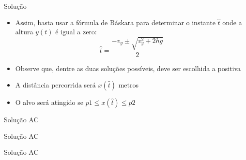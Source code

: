 \begin{frame}[fragile]{Solução}

    \begin{itemize}
        \item Assim, basta usar a fórmula de Báskara para determinar o instante $\hat{t}$ onde
            a altura $y(t)$ é igual a zero:
        \[
            \hat{t} = \frac{-v_y \pm \sqrt{v_y^2 + 2hg}}{2}
        \]

        \item Observe que, dentre as duas soluções possíveis, deve ser escolhida a positiva

        \item A distância percorrida será $x(\hat{t})$ metros

        \item O alvo será atingido se $p1 \leq x(\hat{t})\leq p2$
    \end{itemize}

\end{frame}

\begin{frame}[fragile]{Solução AC}
\end{frame}

\begin{frame}[fragile]{Solução AC}
\end{frame}

\begin{frame}[fragile]{Solução AC}
\end{frame}
